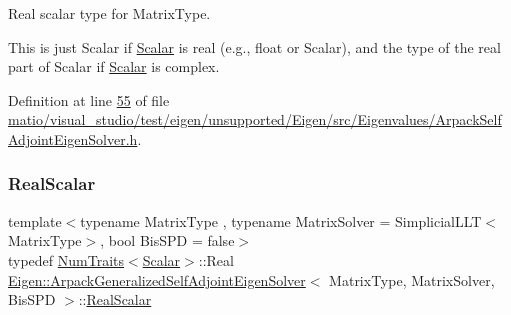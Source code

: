 Real scalar type for {\ttfamily Matrix\+Type}. 

This is just {\ttfamily Scalar} if \hyperlink{class_eigen_1_1_arpack_generalized_self_adjoint_eigen_solver_ab1182405bfe87a505d4b7a8311c661ec}{Scalar} is real (e.\+g., {\ttfamily float} or {\ttfamily Scalar}), and the type of the real part of {\ttfamily Scalar} if \hyperlink{class_eigen_1_1_arpack_generalized_self_adjoint_eigen_solver_ab1182405bfe87a505d4b7a8311c661ec}{Scalar} is complex. 

Definition at line \hyperlink{matio_2visual__studio_2test_2eigen_2unsupported_2_eigen_2src_2_eigenvalues_2_arpack_self_adjoint_eigen_solver_8h_source_l00055}{55} of file \hyperlink{matio_2visual__studio_2test_2eigen_2unsupported_2_eigen_2src_2_eigenvalues_2_arpack_self_adjoint_eigen_solver_8h_source}{matio/visual\+\_\+studio/test/eigen/unsupported/\+Eigen/src/\+Eigenvalues/\+Arpack\+Self\+Adjoint\+Eigen\+Solver.\+h}.

\mbox{\label{class_eigen_1_1_arpack_generalized_self_adjoint_eigen_solver_a2555af55e53bf9de894a49e639be2e1e}} 
\subsubsection{\texorpdfstring{Real\+Scalar}{RealScalar}\hspace{0.1cm}{\footnotesize\ttfamily [2/2]}}
{\footnotesize\ttfamily template$<$typename Matrix\+Type , typename Matrix\+Solver  = Simplicial\+L\+L\+T$<$\+Matrix\+Type$>$, bool Bis\+S\+PD = false$>$ \\
typedef \hyperlink{group___core___module_struct_eigen_1_1_num_traits}{Num\+Traits}$<$\hyperlink{class_eigen_1_1_arpack_generalized_self_adjoint_eigen_solver_ab1182405bfe87a505d4b7a8311c661ec}{Scalar}$>$\+::Real \hyperlink{class_eigen_1_1_arpack_generalized_self_adjoint_eigen_solver}{Eigen\+::\+Arpack\+Generalized\+Self\+Adjoint\+Eigen\+Solver}$<$ Matrix\+Type, Matrix\+Solver, Bis\+S\+PD $>$\+::\hyperlink{class_eigen_1_1_arpack_generalized_self_adjoint_eigen_solver_a2555af55e53bf9de894a49e639be2e1e}{Real\+Scalar}}



